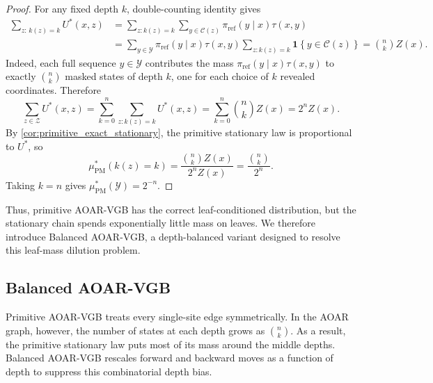 \documentclass{article}
\numberwithin{theorem}{section}
\numberwithin{proposition}{section}
\numberwithin{corollary}{section}
\numberwithin{lemma}{section}
\numberwithin{conjecture}{section}
\numberwithin{remark}{section}
\numberwithin{definition}{section}
\numberwithin{assumption}{section}
\numberwithin{example}{section}
\newcommand{\calC}{{\mathcal{C}}}
\newcommand{\calY}{{\mathcal{Y}}}
\newcommand{\calZ}{{\mathcal{Z}}}
\newcommand{\mbra}[1]{\left\{#1\right\}}
\providecommand{\base}{\pi_{\mathrm{ref}}}
\begin{document}
\begin{proof}
For any fixed depth $k$, double-counting identity gives
\begin{align*}
    \sum_{z:\,k(z)=k} U^*(x,z) &= \sum_{z:k(z)=k} \sum_{y \in \calC(z)} \base(y \mid x) \tau(x,y) \\
    &= \sum_{y \in \calY} \base(y\mid x) \tau(x,y) \sum_{z : k(z) =k} \mathbf{1}\mbra{y \in \calC(z)}= \binom{n}{k} Z(x).
\end{align*}
Indeed, each full sequence $y\in\calY$ contributes the mass $\base(y\mid x)\tau(x,y)$ to exactly $\binom{n}{k}$ masked states of depth $k$, one for each choice of $k$ revealed coordinates. Therefore
\begin{equation*}
    \sum_{z\in\calZ} U^*(x,z) = \sum_{k=0}^n \sum_{z:k(z)=k} U^*(x,z)= \sum_{k=0}^n \binom{n}{k}Z(x) = 2^n Z(x).
\end{equation*}
By \cref{cor:primitive_exact_stationary}, the primitive stationary law is proportional to $U^*$, so
\begin{equation*}
    \mu_{\mathrm{PM}}^*(k(z)=k) = \frac{\binom{n}{k}Z(x)}{2^n Z(x)} = \frac{\binom{n}{k}}{2^n}.
\end{equation*}
Taking $k=n$ gives $\mu_{\mathrm{PM}}^*(\calY)=2^{-n}$.
\end{proof}

Thus, primitive AOAR-VGB has the correct leaf-conditioned distribution, but the stationary chain spends exponentially little mass on leaves. We therefore introduce Balanced AOAR-VGB, a depth-balanced variant designed to resolve this leaf-mass dilution problem.


\subsection{Balanced AOAR-VGB}
\label{app:subsec:balanced_aoar_vgb}

Primitive AOAR-VGB treats every single-site edge symmetrically. In the AOAR graph, however, the number of states at each depth grows as $\binom{n}{k}$. As a result, the primitive stationary law puts most of its mass around the middle depths. Balanced AOAR-VGB rescales forward and backward moves as a function of depth to suppress this combinatorial depth bias.
\end{document}
